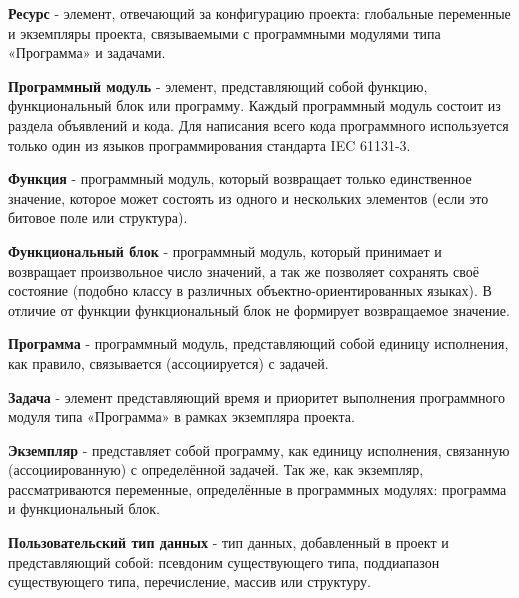 \documentclass[letterpaper,10pt,russian]{sphinxmanual}
\begin{document}
\textbf{Ресурс} - элемент, отвечающий за конфигурацию проекта: глобальные
переменные и экземпляры проекта, связываемыми с программными модулями
типа «Программа» и задачами.

\textbf{Программный модуль} - элемент, представляющий собой функцию,
функциональный блок или программу. Каждый программный модуль состоит из
раздела объявлений и кода. Для написания всего кода программного
используется только один из языков программирования стандарта IEC
61131-3.

\textbf{Функция} - программный модуль, который возвращает только единственное
значение, которое может состоять из одного и нескольких элементов (если
это битовое поле или структура).

\textbf{Функциональный блок} - программный модуль, который принимает и
возвращает произвольное число значений, а так же позволяет сохранять
своё состояние (подобно классу в различных объектно-ориентированных
языках). В отличие от функции функциональный блок не формирует
возвращаемое значение.

\textbf{Программа} - программный модуль, представляющий собой единицу
исполнения, как правило, связывается (ассоциируется) с задачей.

\textbf{Задача} - элемент представляющий время и приоритет выполнения
программного модуля типа «Программа» в рамках экземпляра проекта.

\textbf{Экземпляр} - представляет собой программу, как единицу исполнения,
связанную (ассоциированную) с определённой задачей. Так же, как
экземпляр, рассматриваются переменные, определённые в программных
модулях: программа и функциональный блок.

\textbf{Пользовательский тип данных} - тип данных, добавленный в проект и
представляющий собой: псевдоним существующего типа, поддиапазон
существующего типа, перечисление, массив или структуру.
\end{document}
